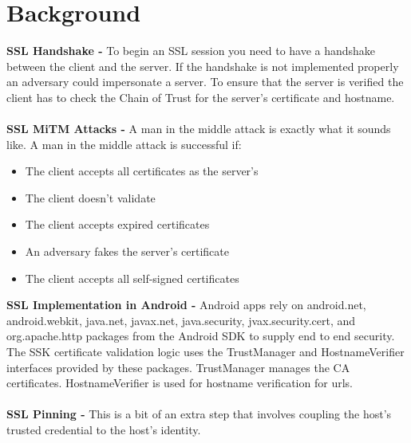 \documentclass{article}
\begin{document}
\section{Background}
\textbf{SSL Handshake -} To begin an SSL session you need to have a handshake between the client and the server. If the handshake is not implemented properly an adversary could impersonate a server. To ensure that the server is verified the client has to check the Chain of Trust for the server's certificate and hostname. 
\\\\\textbf{SSL MiTM Attacks -} A man in the middle attack is exactly what it sounds like. A man in the middle attack is successful if:
\\\begin{itemize}
\item The client accepts all certificates as the server's
\item The client doesn't validate 
\item The client accepts expired certificates
\item An adversary fakes the server's certificate
\item The client accepts all self-signed certificates
\end{itemize}
\textbf{SSL Implementation in Android -} Android apps rely on android.net, android.webkit, java.net, javax.net, java.security, jvax.security.cert, and org.apache.http packages from the Android SDK to supply end to end security. The SSK certificate validation logic uses the TrustManager and HostnameVerifier interfaces provided by these packages. TrustManager manages the CA certificates. HostnameVerifier is used for hostname verification for urls. 
\\\\\textbf{SSL Pinning - } This is a bit of an extra step that involves coupling the host's trusted credential to the host's identity. 
\end{document}
